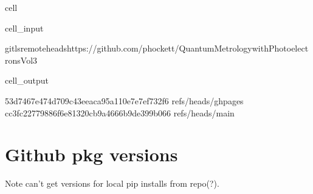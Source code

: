 \documentclass[letterpaper,table,10pt,english]{jupyterBook}
\begin{document}
\begin{sphinxuseclass}{cell}\begin{sphinxVerbatimInput}

\begin{sphinxuseclass}{cell_input}
\begin{sphinxVerbatim}[commandchars=\\\{\}]
gitls\PYGZhy{}remote\PYGZhy{}\PYGZhy{}headshttps://github.com/phockett/Quantum\PYGZhy{}Metrology\PYGZhy{}with\PYGZhy{}Photoelectrons\PYGZhy{}Vol3
\end{sphinxVerbatim}

\end{sphinxuseclass}\end{sphinxVerbatimInput}
\begin{sphinxVerbatimOutput}

\begin{sphinxuseclass}{cell_output}
\begin{sphinxVerbatim}[commandchars=\\\{\}]
53d7467e474d709c43eeaca95a110e7e7ef732f6	refs/heads/gh\PYGZhy{}pages
cc3fc22779886f6e81320cb9a4666b9de399b066	refs/heads/main
\end{sphinxVerbatim}

\end{sphinxuseclass}\end{sphinxVerbatimOutput}

\end{sphinxuseclass}

\section{Github pkg versions}
\label{\detokenize{tests/build_versions_checks:github-pkg-versions}}
\sphinxAtStartPar
Note \sphinxhyphen{} can’t get versions for local pip installs from repo(?).
\end{document}
